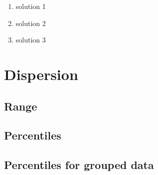  \begin{solutions}{}{
\begin{enumerate}[itemsep=5pt, label=\textbf{\arabic*}. ] 


\item solution 1
\item solution 2
\item solution 3

\end{enumerate}}
\end{solutions}


\section{Dispersion}
\subsection{Range}
\subsection{Percentiles}
\subsection{Percentiles for grouped data}
